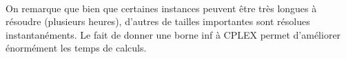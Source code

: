\documentclass[a4paper, 11pt]{article} %
\begin{document}
\paragraph*{}
On remarque que bien que certaines instances peuvent être très longues à résoudre (plusieurs heures), d'autres de tailles importantes sont résolues instantanéments. Le fait de donner une borne inf à CPLEX permet d'améliorer énormément les temps de calculs.

\begin{comment}
\begin{center}
\begin{tabular}{|c|c|c|c|}
  \hline 
  Instance & Glouton & Recuit & Fourmis \\ \hline
  $5\_8\_1$ &  & &  \\ \hline 
  $5\_8\_2$ &  & &  \\ \hline 
  $5\_8\_3$ &  & &  \\ \hline 
  $5\_8\_4$ &  & &  \\ \hline 
  $5\_8\_5$ &  & &  \\ \hline 
  $5\_8\_6$ &  & &  \\ \hline 
  $5\_8\_7$ &  & &  \\ \hline 
  $5\_8\_8$ &  & &  \\ \hline 
  $5\_8\_9$ &  & &  \\ \hline 
  $5\_8\_10$ &  & &  \\ \hline 
  
  $12\_10\_1$ &  & &  \\ \hline
  $12\_10\_2$ &  & & \\ \hline
  $12\_10\_3$ &  & &  \\ \hline
  $12\_10\_4$ &  & &  \\ \hline
  $12\_10\_5$ &  & &  \\ \hline
  $12\_10\_6$ &  & &  \\ \hline
  $12\_10\_7$ &  & &  \\ \hline
  $12\_10\_8$ &  & &  \\ \hline
  $12\_10\_9$ &  & &  \\ \hline
  $12\_10\_10$ &  & &  \\ \hline
  
  $15\_17\_1$ &  & &  \\ \hline
  $15\_17\_2$ &  & &  \\ \hline
  $15\_17\_3$ &  & &  \\ \hline
  $15\_17\_4$ &  & &  \\ \hline
  $15\_17\_5$ &  & &  \\ \hline
  $15\_17\_6$ &  & &  \\ \hline
  $15\_17\_7$ &  & &  \\ \hline
  $15\_17\_8$ &  & &  \\ \hline
  $15\_17\_9$ &  & & \\ \hline
  $15\_17\_10$ &  & &  \\ \hline
   

\end{comment}
\end{document}
